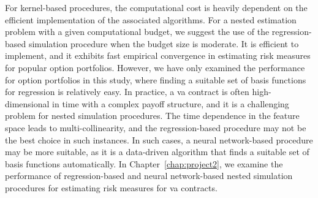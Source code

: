 For kernel-based procedures, the computational cost is heavily dependent on the efficient implementation of the associated algorithms.
For a nested estimation problem with a given computational budget, we suggest the use of the regression-based simulation procedure when the budget size is moderate. 
It is efficient to implement, and it exhibits fast empirical convergence in estimating risk measures for popular option portfolios. 
However, we have only examined the performance for option portfolios in this study, where finding a suitable set of basis functions for regression is relatively easy.
In practice, a \gls{va} contract is often high-dimensional in time with a complex payoff structure, and it is a challenging problem for nested simulation procedures.
The time dependence in the feature space leads to multi-collinearity, and the regression-based procedure may not be the best choice in such instances.
In such cases, a neural network-based procedure may be more suitable, as it is a data-driven algorithm that finds a suitable set of basis functions automatically.
In Chapter~\ref{chap:project2}, we examine the performance of regression-based and neural network-based nested simulation procedures for estimating risk measures for \gls{va} contracts.
